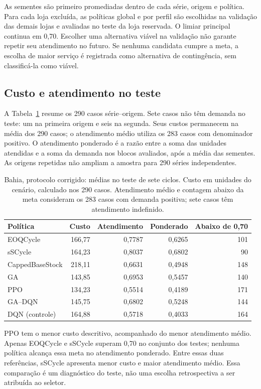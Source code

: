 As sementes são primeiro promediadas dentro de cada série, origem e política. Para cada loja excluída, as políticas global e por perfil são escolhidas na validação das demais lojas e avaliadas no teste da loja reservada. O limiar principal continua em 0,70. Escolher uma alternativa viável na validação não garante repetir seu atendimento no futuro. Se nenhuma candidata cumpre a meta, a escolha de maior serviço é registrada como alternativa de contingência, sem classificá-la como viável.

\subsection{Custo e atendimento no teste}

A Tabela~\ref{tab:ba2026_portfolio} resume os 290 casos série--origem. Sete casos não têm demanda no teste: um na primeira origem e seis na segunda. Seus custos permanecem na média dos 290 casos; o atendimento médio utiliza os 283 casos com denominador positivo. O atendimento ponderado é a razão entre a soma das unidades atendidas e a soma da demanda nos blocos avaliados, após a média das sementes. As origens repetidas não ampliam a amostra para 290 séries independentes.

\begin{table}[htbp]
\centering\small
\caption{Bahia, protocolo corrigido: médias no teste de sete ciclos. Custo em unidades do cenário, calculado nos 290 casos. Atendimento médio e contagem abaixo da meta consideram os 283 casos com demanda positiva; sete casos têm atendimento indefinido.}
\label{tab:ba2026_portfolio}
\begin{tabular}{@{}lrrrr@{}}\toprule
Política & Custo & Atendimento & Ponderado & Abaixo de 0,70\\\midrule
EOQCycle &166,77&0,7787&0,6265&101\\
sSCycle &164,23&0,8037&0,6802&90\\
CappedBaseStock &218,11&0,6631&0,4948&148\\
GA &143,85&0,6953&0,5457&140\\
PPO &134,23&0,5514&0,4189&171\\
GA--DQN &145,75&0,6802&0,5248&144\\
DQN (controle) &164,88&0,5718&0,4033&164\\
\bottomrule\end{tabular}
\end{table}

PPO tem o menor custo descritivo, acompanhado do menor atendimento médio. Apenas EOQCycle e sSCycle superam 0,70 no conjunto dos testes; nenhuma política alcança essa meta no atendimento ponderado. Entre essas duas referências, sSCycle apresenta menor custo e maior atendimento médio. Essa comparação é um diagnóstico do teste, não uma escolha retrospectiva a ser atribuída ao seletor.

